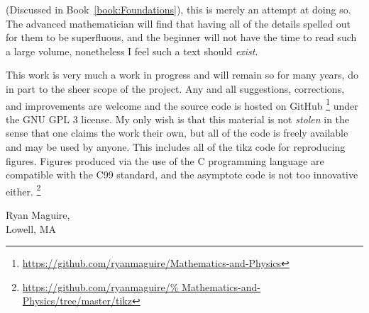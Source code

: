 (Discussed in Book~\ref{book:Foundations}), this is merely an attempt at doing
so. The advanced mathematician will find that having all of the details spelled
out for them to be superfluous, and the beginner will not have the time to read
such a large volume, nonetheless I feel such a text should \textit{exist}. 
\par\hfill\par
This work is very much a work in progress and will remain so for many years, do
in part to the sheer scope of the project. Any and all suggestions, corrections,
and improvements are welcome and the source code is hosted on GitHub%
\footnote{\url{https://github.com/ryanmaguire/Mathematics-and-Physics}} under
the GNU GPL 3 license. My only wish is that this material is not
\textit{stolen} in the sense that one claims the work their own, but all of the
code is freely available and may be used by anyone. This includes all of the
tikz code for reproducing figures. Figures produced via the use of the C
programming language are compatible with the C99 standard, and the asymptote
code is not too innovative either.%
\footnote{\url{https://github.com/ryanmaguire/%
               Mathematics-and-Physics/tree/master/tikz}}
\begin{flushright}
    Ryan Maguire,\\
    Lowell, MA\\
\end{flushright}